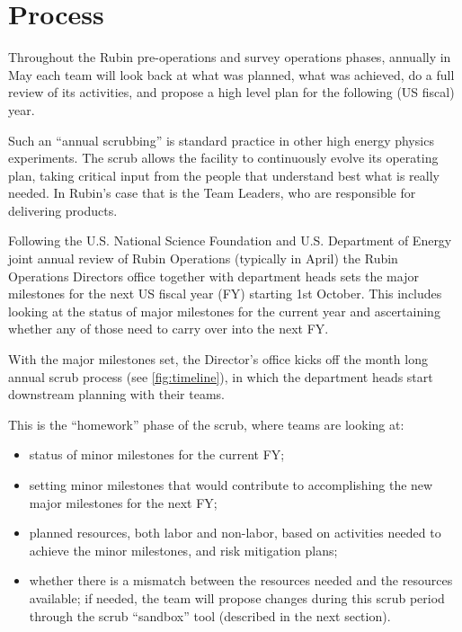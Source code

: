 \section{Process} \label{sec:process}

Throughout the Rubin pre-operations and survey operations phases, annually in May each team will look back at what was planned, what was achieved, do a full review of its activities, and propose a high level plan for the following (US fiscal) year.

Such an ``annual scrubbing'' is standard practice in other high energy physics experiments. 
The scrub allows the facility to continuously evolve its operating plan, taking critical input from the people that understand best what is really needed. 
In Rubin’s case that is the Team Leaders, who are responsible for delivering products.

Following the U.S. National Science Foundation and U.S. Department of Energy joint annual review of Rubin Operations (typically in April) the Rubin Operations Directors office together with department heads sets the major milestones for the next US fiscal year (FY) starting 1st October. 
This includes looking at the status of major milestones for the current year and ascertaining whether any of those need to carry over into the next FY.

With the major milestones set, the Director’s office kicks off the month long annual scrub process (see \autoref{fig:timeline}), in which the department heads start downstream planning with their teams. 

This is the ``homework'' phase of the scrub, where teams are looking at:
\begin{itemize}
\item status of minor milestones for the current FY;
\item setting minor milestones that would contribute to accomplishing the new major milestones for the next FY;
\item planned resources, both labor and non-labor, based on activities needed to achieve the minor milestones, and risk mitigation plans;
\item whether there is a mismatch between the resources needed and the resources available; if needed, the team will propose changes during this scrub period through the scrub ``sandbox'' tool (described in the next section).
\end{itemize}

